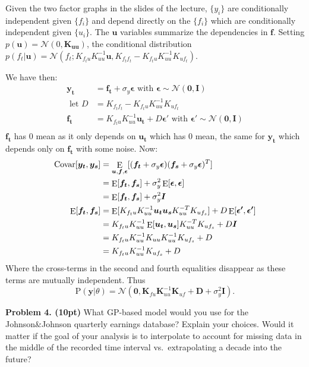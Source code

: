 \documentclass[12pt]{article}
\DeclareMathOperator*{\E}{\rm E}
\newcommand{\p}{\mathrm{P}}
\newcommand{\vect}[1]{\bm{#1}} %
\newcommand{\matr}[1]{\bm{#1}} %
\newcommand{\Covar}{\mathrm{Covar}}
\begin{document}
Given the two factor graphs in the slides of the lecture, $\{y_i\}$ are conditionally independent given  $\{f_i\}$  and depend directly on the $\{f_i\}$ which are conditionally independent  given $\{u_i\}$. 
The $\vect{u}$ variables summarize the dependencies in $\vect{f}$. Setting $p(\vect{u}) = \mathcal{N}(0,\matr{K_{uu}})$, 
the conditional distribution $p(f_t|\vect{u}) =  \mathcal{N}(f_t; K_{f_tu} K_{uu}^{-1} \vect{u}, K_{f_tf_t} -  K_{f_tu}  K_{uu}^{-1} K_{uf_t})$.

We have then:
\begin{align*}
	\vect{y_t}	&=	\vect{f_t} + \sigma_y \vect{\epsilon} \text{ with } \vect{\epsilon} \sim  \mathcal{N}(\vect{0},\vect{I}) \\
	\text{ let } D		&=	K_{f_tf_t} -  K_{f_tu}  K_{uu}^{-1} K_{uf_t} \\
	\vect{f_t}	&= 	 K_{f_tu} K_{uu}^{-1} \vect{u_t} + D \vect{\epsilon'} \text{ with } \vect{\epsilon'} \sim  \mathcal{N}(\vect{0},\vect{I}) \\
\end{align*}
$\vect{f_t}$ has 0 mean as it only depends on $\vect{u_t}$  which has 0 mean, the same for $\vect{y_t}$ which depends only on $\vect{f_t}$ with some noise.
Now:
\begin{align*}
	\Covar[\vect{y_t},\vect{y_s}]	&= \E_{\vect{u}, \vect{f}, \vect{\epsilon}}[(\vect{f_t} + \sigma_y \vect{\epsilon}) (\vect{f_s} + \sigma_y \vect{\epsilon})^T]	\\
							&= \E[\vect{f_t}, \vect{f_s}] + \sigma_y^2 \E[\vect{\epsilon}, \vect{\epsilon}] \\
							&= \E[\vect{f_t}, \vect{f_s}] +  \sigma_y^2 \vect{I} \\
	\E[\vect{f_t}, \vect{f_s}] 		&= \E[K_{f_tu} K_{uu}^{-1} \vect{u_t} \vect{u_s} K_{uu}^{-T}K_{uf_s}] + D \E[\vect{\epsilon'}, \vect{\epsilon'}] \\
							&= K_{f_tu} K_{uu}^{-1} \E[\vect{u_t}, \vect{u_s}]  K_{uu}^{-T}K_{uf_s} + D \vect{I} \\
							&=  K_{f_tu} K_{uu}^{-1} K_{uu}   K_{uu}^{-1} K_{uf_s} + D \\
							&= K_{f_tu} K_{uu}^{-1}   K_{uf_s} + D 
\end{align*}
Where the cross-terms in the second  and fourth equalities disappear as these terms are mutually independent.
Thus $$\p(\vect{y}|\theta) = \mathcal{N}\left( \mathbf{0},  \mathbf{K}_{fu} \mathbf{K}_{uu}^{-1}\mathbf{K}_{uf}  + \mathbf{D} + \sigma_y^2 \mathbf{I}\right).$$

\noindent \textbf{Problem 4. (10pt)} 
What GP-based model would you use for the Johnson\&Johnson quarterly earnings database?
Explain your choices. Would it matter if the goal of your analysis is to interpolate to account for missing data in the middle of the recorded time interval vs.\ extrapolating a decade into the future?\\
\end{document}
